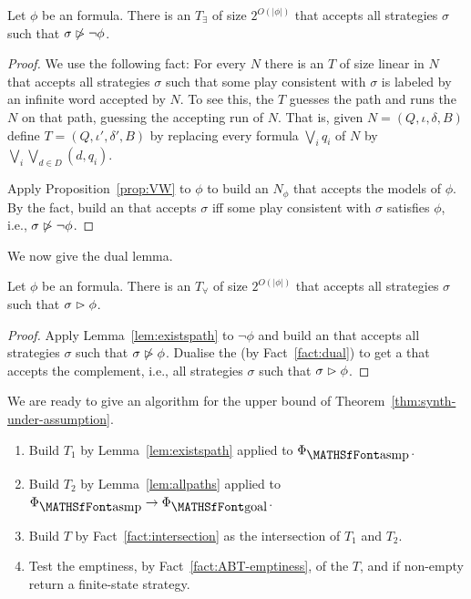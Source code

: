 \begin{lemma} \label{lem:existspath}
Let $\phi$ be an \LTL formula. 
There is an \NBT $T_\exists$ of size $2^{O(|\phi|)}$ that accepts all strategies $\sigma$ such that $\sigma \not \vartriangleright \neg \phi$.
\end{lemma}

\begin{proof}
We use the following fact: For every \NBW $N$ there is an \NBT $T$ of size linear in $N$ that accepts all strategies $\sigma$ such that some play consistent with $\sigma$ is labeled by an infinite word accepted by $N$. To see this, the \NBT $T$ guesses the path and runs the \NBW $N$ on that path, guessing the accepting run of $N$. That is, given $N = (Q,\iota,\delta,B)$ define $T = (Q,\iota',\delta',B)$ by replacing every formula $\bigvee_i q_i$ of $N$ by $\bigvee_i \bigvee_{d \in D} (d,q_i)$.

Apply Proposition~\ref{prop:VW} to $\phi$ to build an \NBW $N_\phi$ that accepts the models of $\phi$. By the fact, build an \NBT that accepts $\sigma$ iff some play consistent with $\sigma$ satisfies $\phi$, i.e., $\sigma \not \vartriangleright \neg \phi$.
\end{proof}


We now give the dual lemma.
\begin{lemma} \label{lem:allpaths}
Let $\phi$ be an \LTL formula. 
There is an \UCT $T_\forall$ of size $2^{O(|\phi|)}$ that accepts all strategies $\sigma$ such that $\sigma \vartriangleright \phi$.
\end{lemma}

\begin{proof}
Apply Lemma~\ref{lem:existspath} to $\neg \phi$ and build an \NBT that accepts all strategies $\sigma$ such that $\sigma \not \vartriangleright \phi$. Dualise the \NBT (by Fact~\ref{fact:dual}) 
to get a \UCT that accepts the complement, i.e., all strategies $\sigma$ such that $\sigma \vartriangleright \phi$.
\end{proof}



We are ready to give an algorithm for the upper bound of Theorem~\ref{thm:synth-under-assumption}.

\begin{enumerate}
 \item Build \NBT $T_1$ by Lemma~\ref{lem:existspath} applied to $\formula{\asmp}$. 
 \item Build \UCT $T_2$ by Lemma~\ref{lem:allpaths} applied to $\formula{\asmp} \limp \formula{\goal}$.
 \item Build \ABT $T$ by Fact~\ref{fact:intersection} as the intersection of $T_1$ and $T_2$.
 \item Test the emptiness, by Fact~\ref{fact:ABT-emptiness}, of the \ABT $T$, and if non-empty return a finite-state strategy.
\end{enumerate}
  

